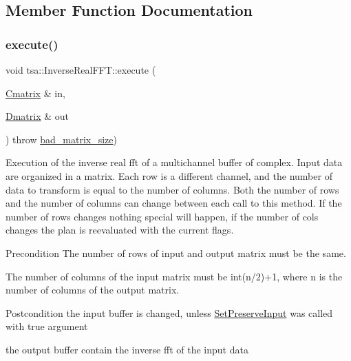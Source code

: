 \subsection{Member Function Documentation}
\mbox{\label{classtsa_1_1_inverse_real_f_f_t_ac37c11d801f396360818a54dddf1c9d1}} 
\subsubsection{\texorpdfstring{execute()}{execute()}\hspace{0.1cm}{\footnotesize\ttfamily [1/4]}}
{\footnotesize\ttfamily void tsa\+::\+Inverse\+Real\+F\+F\+T\+::execute (\begin{DoxyParamCaption}\item[{\hyperlink{namespacetsa_a86348fef1603a135fe5fba9e5f5486ee}{Cmatrix} \&}]{in,  }\item[{\hyperlink{namespacetsa_ad260cd21c1891c4ed391fe788569aba4}{Dmatrix} \&}]{out }\end{DoxyParamCaption}) throw  \hyperlink{classtsa_1_1bad__matrix__size}{bad\+\_\+matrix\+\_\+size}) }

Execution of the inverse real fft of a multichannel buffer of complex. Input data are organized in a matrix. Each row is a different channel, and the number of data to transform is equal to the number of columns. Both the number of rows and the number of columns can change between each call to this method. If the number of rows changes nothing special will happen, if the number of cols changes the plan is reevaluated with the current flags.

\begin{DoxyPrecond}{Precondition}
The number of rows of input and output matrix must be the same. 

The number of columns of the input matrix must be int(n/2)+1, where n is the number of columns of the output matrix.
\end{DoxyPrecond}
\begin{DoxyPostcond}{Postcondition}
the input buffer is changed, unless \hyperlink{classtsa_1_1_base_f_f_t_a5b1e2f36dbdfe197aa6c74d1cf963f40}{Set\+Preserve\+Input} was called with true argument 

the output buffer contain the inverse fft of the input data 
\end{DoxyPostcond}

